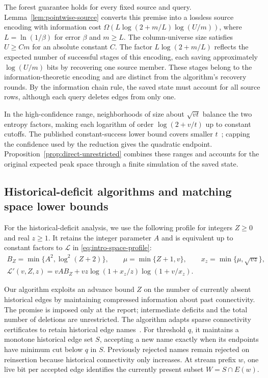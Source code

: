 \documentclass[11pt,letterpaper]{article}
\numberwithin{equation}{section}
\begin{document}
The forest guarantee holds for every fixed source and query.
Lemma~\ref{lem:pointwise-source} converts this premise into a lossless source encoding with information cost $\Omega(L\log(2+m/L)\log(U/m))$, where $L=\ln(1/\beta)$ for error $\beta$ and $m\ge L$.
The column-universe size satisfies $U\ge Cm$ for an absolute constant $C$.
The factor $L\log(2+m/L)$ reflects the expected number of successful stages of this encoding, each saving approximately $\log(U/m)$ bits by recovering one source member.
These stages belong to the information-theoretic encoding and are distinct from the algorithm's recovery rounds.
By the information chain rule, the saved state must account for all source rows, although each query deletes edges from only one.

In the high-confidence range, neighborhoods of size about $\sqrt{vt}$ balance the two entropy factors, making each logarithm of order $\log(2+v/t)$ up to constant cutoffs.
The published constant-success lower bound covers smaller $t$~\cite{NelsonYu2019}; capping the confidence used by the reduction gives the quadratic endpoint.
Proposition~\ref{prop:direct-unrestricted} combines these ranges and accounts for the original expected peak space through a finite simulation of the saved state.

\subsection{Historical-deficit algorithms and matching space lower bounds}
\label{sec:graph-reserves-main}

For the historical-deficit analysis, we use the following profile for integers $Z\ge0$ and real $z\ge1$. It retains the integer parameter $A$ and is equivalent up to constant factors to $\mathcal L$ in \eqref{eq:intro-space-profile}:
\begin{equation}
\begin{gathered}
 B_Z=\min\{A^2,\log^2(Z+2)\},\qquad
 \mu=\min\{Z+1,v\},\qquad x_z=\min\{\mu,\sqrt{vz}\},\\
 \mathcal L'(v,Z,z)=vAB_Z+
 vz\log(1+x_z/z)\log(1+v/x_z).
\end{gathered}
\label{eq:analysis-frontier}
\end{equation}

Our algorithm exploits an advance bound $Z$ on the number of currently absent historical edges by maintaining compressed information about past connectivity.
The promise is imposed only at the report; intermediate deficits and the total number of deletions are unrestricted.
The algorithm adapts sparse connectivity certificates to retain historical edge names~\cite{NagamochiIbaraki1992,JinKapralovMahabadiVakilian2024}.
For threshold $q$, it maintains a monotone historical edge set $S$, accepting a new name exactly when its endpoints have minimum cut below $q$ in $S$.
Previously rejected names remain rejected on reinsertion because historical connectivity only increases.
At stream prefix $w$, one live bit per accepted edge identifies the currently present subset $W=S\cap E(w)$.
\end{document}
